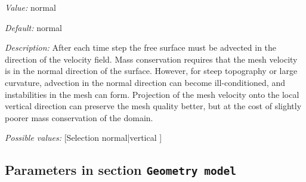 \begin{itemize}
{\it Value:} normal


{\it Default:} normal


{\it Description:} After each time step the free surface must be advected in the direction of the velocity field. Mass conservation requires that the mesh velocity is in the normal direction of the surface. However, for steep topography or large curvature, advection in the normal direction can become ill-conditioned, and instabilities in the mesh can form. Projection of the mesh velocity onto the local vertical direction can preserve the mesh quality better, but at the cost of slightly poorer mass conservation of the domain.


{\it Possible values:} [Selection normal|vertical ]
\end{itemize}

\subsection{Parameters in section \tt Geometry model}
\label{parameters:Geometry_20model}


